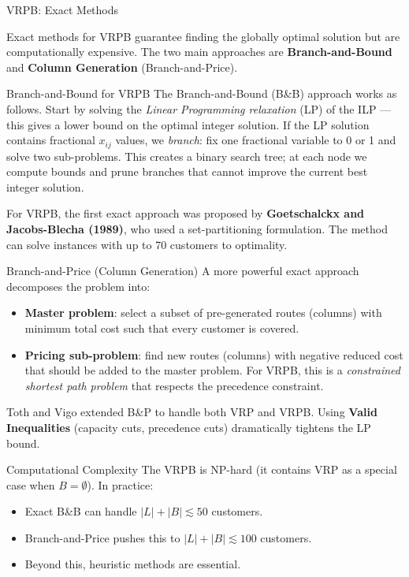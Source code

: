 \documentclass[aspectratio=169,10pt]{beamer}
\begin{document}
\begin{frame}[allowframebreaks]{VRPB: Exact Methods}

Exact methods for VRPB guarantee finding the globally optimal solution but
are computationally expensive.  The two main approaches are
\textbf{Branch-and-Bound} and \textbf{Column Generation} (Branch-and-Price).

\begin{block}{Branch-and-Bound for VRPB}
  The Branch-and-Bound (B\&B) approach works as follows.  Start by solving the
  \emph{Linear Programming relaxation} (LP) of the ILP --- this gives a lower
  bound on the optimal integer solution.  If the LP solution contains
  fractional $x_{ij}$ values, we \emph{branch}: fix one fractional variable
  to 0 or 1 and solve two sub-problems.  This creates a binary search tree;
  at each node we compute bounds and prune branches that cannot improve the
  current best integer solution.

  \medskip
  For VRPB, the first exact approach was proposed by \textbf{Goetschalckx
  and Jacobs-Blecha (1989)}, who used a set-partitioning formulation.  The
  method can solve instances with up to 70 customers to optimality.
\end{block}

\begin{block}{Branch-and-Price (Column Generation)}
  A more powerful exact approach decomposes the problem into:
  \begin{itemize}
    \item \textbf{Master problem}: select a subset of pre-generated routes
          (columns) with minimum total cost such that every customer is
          covered.
    \item \textbf{Pricing sub-problem}: find new routes (columns) with
          negative reduced cost that should be added to the master problem.
          For VRPB, this is a \emph{constrained shortest path problem} that
          respects the precedence constraint.
  \end{itemize}
  Toth and Vigo extended B\&P to handle both VRP and VRPB.  Using
  \textbf{Valid Inequalities} (capacity cuts, precedence cuts) dramatically
  tightens the LP bound.
\end{block}

\framebreak

\begin{block}{Computational Complexity}
  The VRPB is NP-hard (it contains VRP as a special case when $B = \emptyset$).
  In practice:
  \begin{itemize}
    \item Exact B\&B can handle $|L|+|B| \lesssim 50$ customers.
    \item Branch-and-Price pushes this to $|L|+|B| \lesssim 100$ customers.
    \item Beyond this, heuristic methods are essential.
  \end{itemize}
\end{block}


\end{frame}
\end{document}
